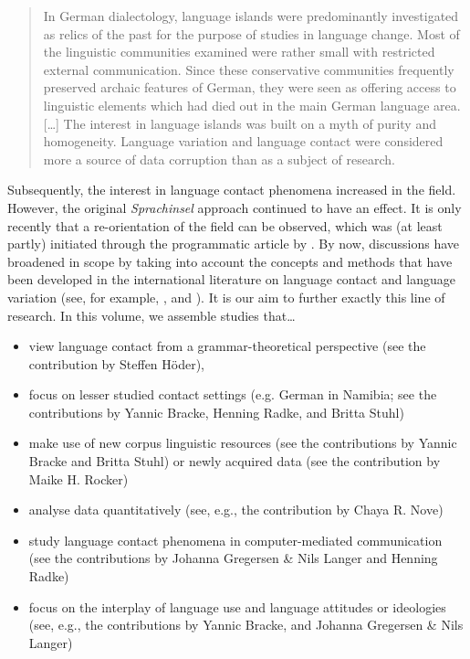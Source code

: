 \documentclass[output=paper]{langsci/langscibook}
\begin{document}
\begin{quote}
In German dialectology, language islands were predominantly investigated as relics of the past for the purpose of studies in language change. Most of the linguistic communities examined were rather small with restricted external communication. Since these conservative communities frequently preserved archaic features of German, they were seen as offering access to linguistic elements which had died out in the main German language area. […] The interest in language islands was built on a myth of purity and homogeneity. Language variation and language contact were considered more a source of data corruption than as a subject of research. \citep[222–223]{rosenberg_dialect_2005}
\end{quote}

Subsequently, the interest in language contact phenomena increased in the field. However, the original \textit{Sprachinsel} approach continued to have an effect. It is only recently that a re-orientation of the field can be observed, which was (at least partly) initiated through the programmatic article by \citet{mattheier_theorie_1994}. By now, discussions have broadened in scope by taking into account the concepts and methods that have been developed in the international literature on language contact and language variation (see, for example, \citealt{putnam_studies_2011}, \citealt{page_moribund_2015} and \citealt{boas_constructions_2018}). It is our aim to further exactly this line of research. In this volume, we assemble studies that…
     
\begin{itemize}
\item view language contact from a grammar-theoretical perspective (see the contribution by Steffen Höder),
\item focus on lesser studied contact settings (e.g. German in Namibia; see the contributions by Yannic Bracke, Henning Radke, and Britta Stuhl) 
\item make use of new corpus linguistic resources (see the contributions by Yannic Bracke and Britta Stuhl) or newly acquired data (see the contribution by Maike H. Rocker)
\item analyse data quantitatively (see, e.g., the contribution by Chaya R. Nove)
\item study language contact phenomena in computer-mediated communication (see the contributions by Johanna Gregersen \& Nils Langer and Henning Radke)
\item focus on the interplay of language use and language attitudes or ideologies (see, e.g., the contributions by Yannic Bracke, and Johanna Gregersen \& Nils Langer)
\end{itemize}
\end{document}

